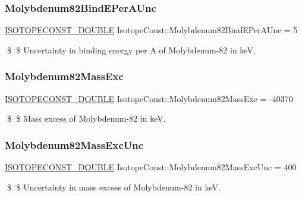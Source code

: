 \subsubsection{\texorpdfstring{Molybdenum82\+Bind\+E\+Per\+A\+Unc}{Molybdenum82BindEPerAUnc}}
{\footnotesize\ttfamily \mbox{\hyperlink{group___isotope_const-_macros_ga8f45a7272ce02c0b4c65c44636ed719a}{I\+S\+O\+T\+O\+P\+E\+C\+O\+N\+S\+T\+\_\+\+D\+O\+U\+B\+LE}} Isotope\+Const\+::\+Molybdenum82\+Bind\+E\+Per\+A\+Unc = 5}

\$ \$ Uncertainty in binding energy per A of Molybdenum-\/82 in keV. \mbox{\label{group___isotope_const-_molybdenum-_mo82_ga07f6bf9e1e1f71390b3bd91985a25be0}} 
\subsubsection{\texorpdfstring{Molybdenum82\+Mass\+Exc}{Molybdenum82MassExc}}
{\footnotesize\ttfamily \mbox{\hyperlink{group___isotope_const-_macros_ga8f45a7272ce02c0b4c65c44636ed719a}{I\+S\+O\+T\+O\+P\+E\+C\+O\+N\+S\+T\+\_\+\+D\+O\+U\+B\+LE}} Isotope\+Const\+::\+Molybdenum82\+Mass\+Exc = -\/40370}

\$ \$ Mass excess of Molybdenum-\/82 in keV. \mbox{\label{group___isotope_const-_molybdenum-_mo82_gaa91f6dba1a531299402f4fd6fe561df0}} 
\subsubsection{\texorpdfstring{Molybdenum82\+Mass\+Exc\+Unc}{Molybdenum82MassExcUnc}}
{\footnotesize\ttfamily \mbox{\hyperlink{group___isotope_const-_macros_ga8f45a7272ce02c0b4c65c44636ed719a}{I\+S\+O\+T\+O\+P\+E\+C\+O\+N\+S\+T\+\_\+\+D\+O\+U\+B\+LE}} Isotope\+Const\+::\+Molybdenum82\+Mass\+Exc\+Unc = 400}

\$ \$ Uncertainty in mass excess of Molybdenum-\/82 in keV. \mbox{\label{group___isotope_const-_molybdenum-_mo82_ga9dfedef9370605e90589333b7ccbfbd6}} 
